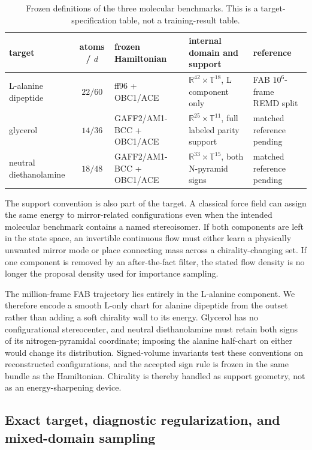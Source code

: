 \documentclass{article}
\begin{document}
\begin{table}[htb]
\centering
\small
\begin{tabular}{@{}l c p{3.3cm} p{3.0cm} p{3.2cm}@{}}
\toprule
target & atoms / \(d\) & frozen Hamiltonian & internal domain and support & reference \\
\midrule
L-alanine dipeptide
& \(22/60\)
& ff96 + OBC1/ACE
& \(\mathbb R^{42}\times\mathbb T^{18}\), L component only
& FAB \(10^6\)-frame REMD split \\
glycerol
& \(14/36\)
& GAFF2/AM1-BCC + OBC1/ACE
& \(\mathbb R^{25}\times\mathbb T^{11}\), full labeled parity support
& matched reference pending \\
neutral diethanolamine
& \(18/48\)
& GAFF2/AM1-BCC + OBC1/ACE
& \(\mathbb R^{33}\times\mathbb T^{15}\), both N-pyramid signs
& matched reference pending \\
\bottomrule
\end{tabular}
\caption{Frozen definitions of the three molecular benchmarks. This is a target-specification table, not a training-result table.}
\label{tab: molecular-targets}
\end{table}

The support convention is also part of the target. A classical force field can assign the same energy to mirror-related configurations even when the intended molecular benchmark contains a named stereoisomer. If both components are left in the state space, an invertible continuous flow must either learn a physically unwanted mirror mode or place connecting mass across a chirality-changing set. If one component is removed by an after-the-fact filter, the stated flow density is no longer the proposal density used for importance sampling.

The million-frame FAB trajectory lies entirely in the L-alanine component. We therefore encode a smooth L-only chart for alanine dipeptide from the outset rather than adding a soft chirality wall to its energy. Glycerol has no configurational stereocenter, and neutral diethanolamine must retain both signs of its nitrogen-pyramidal coordinate; imposing the alanine half-chart on either would change its distribution. Signed-volume invariants test these conventions on reconstructed configurations, and the accepted sign rule is frozen in the same bundle as the Hamiltonian. Chirality is thereby handled as support geometry, not as an energy-sharpening device.

\subsection{Exact target, diagnostic regularization, and mixed-domain sampling}
\label{sec: mol-regularization}
\end{document}
